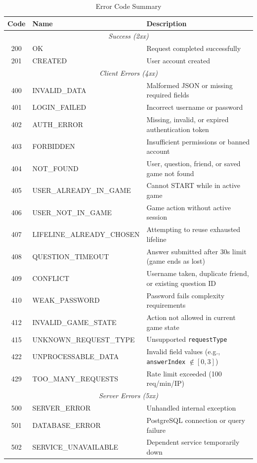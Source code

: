\begin{table}[h]
\centering
\caption{Error Code Summary}
\label{tab:error_codes}
\small
\begin{tabular}{|c|l|p{7cm}|}
\hline
\textbf{Code} & \textbf{Name} & \textbf{Description} \\
\hline
\multicolumn{3}{|c|}{\textit{Success (2xx)}} \\
\hline
200 & OK & Request completed successfully \\
\hline
201 & CREATED & User account created \\
\hline
\multicolumn{3}{|c|}{\textit{Client Errors (4xx)}} \\
\hline
400 & INVALID\_DATA & Malformed JSON or missing required fields \\
\hline
401 & LOGIN\_FAILED & Incorrect username or password \\
\hline
402 & AUTH\_ERROR & Missing, invalid, or expired authentication token \\
\hline
403 & FORBIDDEN & Insufficient permissions or banned account \\
\hline
404 & NOT\_FOUND & User, question, friend, or saved game not found \\
\hline
405 & USER\_ALREADY\_IN\_GAME & Cannot START while in active game \\
\hline
406 & USER\_NOT\_IN\_GAME & Game action without active session \\
\hline
407 & LIFELINE\_ALREADY\_CHOSEN & Attempting to reuse exhausted lifeline \\
\hline
408 & QUESTION\_TIMEOUT & Answer submitted after 30s limit (game ends as lost) \\
\hline
409 & CONFLICT & Username taken, duplicate friend, or existing question ID \\
\hline
410 & WEAK\_PASSWORD & Password fails complexity requirements \\
\hline
412 & INVALID\_GAME\_STATE & Action not allowed in current game state \\
\hline
415 & UNKNOWN\_REQUEST\_TYPE & Unsupported \texttt{requestType} \\
\hline
422 & UNPROCESSABLE\_DATA & Invalid field values (e.g., \texttt{answerIndex} $\notin [0,3]$) \\
\hline
429 & TOO\_MANY\_REQUESTS & Rate limit exceeded (100 req/min/IP) \\
\hline
\multicolumn{3}{|c|}{\textit{Server Errors (5xx)}} \\
\hline
500 & SERVER\_ERROR & Unhandled internal exception \\
\hline
501 & DATABASE\_ERROR & PostgreSQL connection or query failure \\
\hline
502 & SERVICE\_UNAVAILABLE & Dependent service temporarily down \\
\hline
\end{tabular}
\end{table}

